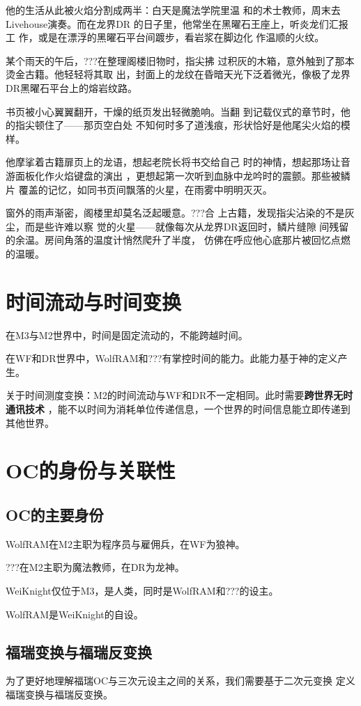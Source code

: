 \documentclass[lang=cn,newtx,10pt,scheme=chinese]{elegantbook}
\newcommand{\wf}{WolfRAM}
\newcommand{\dr}{???}
\newcommand{\wkn}{WeiKnight}
\begin{document}
他的生活从此被火焰分割成两半：白天是魔法学院里温
和的术士教师，周末去Livehouse演奏。而在龙界DR
的日子里，他常坐在黑曜石王座上，听炎龙们汇报工
作，或是在漂浮的黑曜石平台间踱步，看岩浆在脚边化
作温顺的火纹。

某个雨天的午后，\dr{}在整理阁楼旧物时，指尖拂
过积灰的木箱，意外触到了那本烫金古籍。他轻轻将其取
出，封面上的龙纹在昏暗天光下泛着微光，像极了龙界
DR黑曜石平台上的熔岩纹路。​

书页被小心翼翼翻开，干燥的纸页发出轻微脆响。当翻
到记载仪式的章节时，他的指尖顿住了——那页空白处
不知何时多了道浅痕，形状恰好是他尾尖火焰的模样。

他摩挲着古籍扉页上的龙语，想起老院长将书交给自己
时的神情，想起那场让音游面板化作火焰键盘的演出
，更想起第一次听到血脉中龙吟时的震颤。那些被鳞片
覆盖的记忆，如同书页间飘落的火星，在雨雾中明明灭灭。​

窗外的雨声渐密，阁楼里却莫名泛起暖意。\dr{}合
上古籍，发现指尖沾染的不是灰尘，而是些许难以察
觉的火星——就像每次从龙界DR返回时，鳞片缝隙
间残留的余温。房间角落的温度计悄然爬升了半度，
仿佛在呼应他心底那片被回忆点燃的温暖。

\section{时间流动与时间变换}
在M3与M2世界中，时间是固定流动的，不能跨越时间。

在WF和DR世界中，\wf{}和\dr{}有掌控时间的能力。此能力基于神的定义产生。

关于时间测度变换：M2的时间流动与WF和DR不一定相同。此时需要\textbf{跨世界无时通讯技术}
，能不以时间为消耗单位传递信息，一个世界的时间信息能立即传递到其他世界。

\section{OC的身份与关联性}
\subsection{OC的主要身份}
\wf{}在M2主职为程序员与雇佣兵，在WF为狼神。

\dr{}在M2主职为魔法教师，在DR为龙神。

\wkn{}仅位于M3，是人类，同时是\wf{}和\dr{}的设主。

\wf{}是\wkn{}的自设。

\subsection{福瑞变换与福瑞反变换}
为了更好地理解福瑞OC与三次元设主之间的关系，我们需要基于二次元变换
定义福瑞变换与福瑞反变换。
\end{document}
